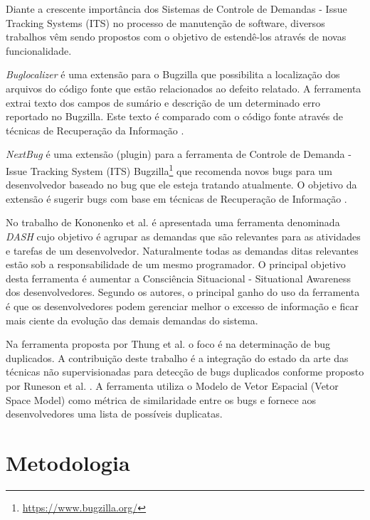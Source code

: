 \documentclass[msc,proposal,hidelot,hideabstract]{ppgccufmg} %
\begin{document}
Diante a crescente importância dos Sistemas de Controle de Demandas -
Issue Tracking Systems (ITS) no processo de manutenção de software, diversos
trabalhos vêm sendo propostos com o objetivo de estendê-los através de novas
funcionalidade.

\textit{Buglocalizer} \cite{Thung:2014:BIT:2635868.2661678} é uma extensão para o Bugzilla que possibilita a
localização dos arquivos do código fonte que estão relacionados ao defeito
relatado. A ferramenta extrai texto dos campos de sumário e descrição de um
determinado erro reportado no Bugzilla. Este texto é comparado com o código
fonte através de técnicas de Recuperação da Informação \cite{baeza1999modern}.

\textit{NextBug} \cite{101186} é uma extensão (plugin) para a ferramenta de Controle de Demanda -
Issue Tracking System (ITS) Bugzilla\footnote{\url{https://www.bugzilla.org/}}
que recomenda novos bugs para um desenvolvedor baseado no bug que ele esteja
tratando atualmente. O objetivo da extensão é sugerir bugs com base em técnicas de
Recuperação de Informação \cite{baeza1999modern}.

No trabalho de Kononenko et al. \cite{Kononenko:2014:DED:2591062.2591075} é
apresentada uma ferramenta denominada \textit{DASH} cujo objetivo é agrupar as
demandas que são relevantes para as atividades e tarefas de um
desenvolvedor. Naturalmente todas as demandas ditas relevantes estão sob a
responsabilidade de um mesmo programador. O principal objetivo desta
ferramenta é aumentar a Consciência Situacional - Situational Awareness dos
desenvolvedores. Segundo os autores, o principal ganho do uso da ferramenta é
que os desenvolvedores podem gerenciar melhor o excesso de informação e ficar
mais ciente da evolução das demais demandas do sistema.


Na ferramenta proposta por Thung et al. \cite{Thung:2014:DIT:2642937.2648627} o
foco é na determinação de bug duplicados. A contribuição deste trabalho é a
integração do estado da arte das técnicas não supervisionadas para detecção de
bugs duplicados conforme proposto por Runeson et
al. \cite{Runeson:2007:DDD:1248820.1248882}. A ferramenta utiliza o Modelo de
Vetor Espacial (Vetor Space Model) como métrica de similaridade entre os bugs e
fornece aos desenvolvedores uma lista de possíveis duplicatas.

\chapter{Metodologia}
\label{ch:metodologia}
\end{document}
